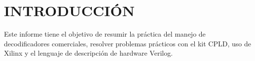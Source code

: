 \section{INTRODUCCIÓN}\sangria{} Este informe tiene el objetivo de resumir la práctica del manejo de decodificadores comerciales, resolver problemas prácticos con el kit CPLD, uso de Xilinx y el lenguaje de descripción de hardware Verilog.
